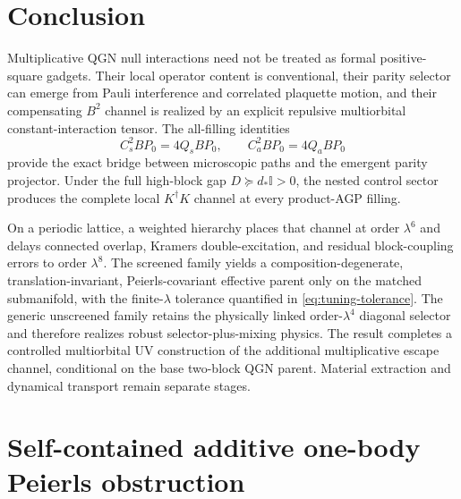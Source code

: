 \documentclass[11pt]{article}
\theoremstyle{definition}
\theoremstyle{remark}
\newcommand{\Id}{\mathbb I}
\begin{document}
\section{Conclusion}

Multiplicative QGN null interactions need not be treated as formal positive-square gadgets.  Their local operator content is conventional, their parity selector can emerge from Pauli interference and correlated plaquette motion, and their compensating $B^2$ channel is realized by an explicit repulsive multiorbital constant-interaction tensor.  The all-filling identities
\begin{equation}
 C_s^2BP_0=4Q_sBP_0,
 \qquad
 C_a^2BP_0=4Q_aBP_0
\end{equation}
provide the exact bridge between microscopic paths and the emergent parity projector.  Under the full high-block gap $D\succeq d_*\Id>0$, the nested control sector produces the complete local $K^\dagger K$ channel at every product-AGP filling.

On a periodic lattice, a weighted hierarchy places that channel at order $\lambda^6$ and delays connected overlap, Kramers double-excitation, and residual block-coupling errors to order $\lambda^8$.  The screened family yields a composition-degenerate, translation-invariant, Peierls-covariant effective parent only on the matched submanifold, with the finite-$\lambda$ tolerance quantified in \eqref{eq:tuning-tolerance}.  The generic unscreened family retains the physically linked order-$\lambda^4$ diagonal selector and therefore realizes robust selector-plus-mixing physics.  The result completes a controlled multiorbital UV construction of the additional multiplicative escape channel, conditional on the base two-block QGN parent.  Material extraction and dynamical transport remain separate stages.


\appendix

\section{Self-contained additive one-body Peierls obstruction}
\label{app:no-go}
\end{document}
